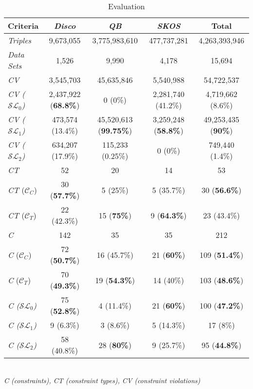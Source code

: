 \documentclass{llncs}
\begin{document}
{{\begin{table}[H]
		\scriptsize
    \begin{center}
    \begin{tabular}{@{}lcccc@{}}
    \\       \textbf{Criteria}
           & \textbf{\emph{Disco}}
           & \textbf{\emph{QB}}
					 & \textbf{\emph{SKOS}}
					 & \textbf{Total}
    \\ \midrule
		\emph{Triples} & 9,673,055 & 3,775,983,610 & 477,737,281 & 4,263,393,946 \\
		\emph{Data Sets} & 1,526 & 9,990 & 4,178 & 15,694 \\
		\hline
    \emph{CV} & 3,545,703 & 45,635,846 & 5,540,988 & 54,722,537\\
		\emph{CV ($\mathcal{SL}_{0}$)} & 2,437,922 (\textbf{68.8\%}) & 0 (0\%) & 2,281,740 (41.2\%) & 4,719,662 (8.6\%) \\
		\emph{CV ($\mathcal{SL}_{1}$)} & 473,574 (13.4\%) & 45,520,613 (\textbf{99.75\%}) & 3,259,248 (\textbf{58.8\%}) & 49,253,435 (\textbf{90\%}) \\
    \emph{CV ($\mathcal{SL}_{2}$)} & 634,207 (17.9\%) & 115,233 (0.25\%) & 0 (0\%) & 749,440 (1.4\%) \\
		\hline
		\emph{CT} & 52 & 20 & 14 & 53 \\
		\emph{CT} ($\mathcal{C}_{C}$) & 30 (\textbf{57.7\%}) & 5 (25\%) & 5 (35.7\%) & 30 (\textbf{56.6\%}) \\
		\emph{CT} ($\mathcal{C}_{T}$) & 22 (42.3\%) & 15 (\textbf{75\%}) & 9 (\textbf{64.3\%}) & 23 (43.4\%) \\
		\hline
		\emph{C} & 142 & 35 & 35 & 212 \\
		\hline
		\emph{C} ($\mathcal{C}_{C}$) & 72 (\textbf{50.7\%}) & 16 (45.7\%) & 21 (\textbf{60\%}) & 109 (\textbf{51.4\%}) \\
		\emph{C} ($\mathcal{C}_{T}$) & 70 (\textbf{49.3\%}) & 19 (\textbf{54.3\%}) & 14 (40\%) & 103 (\textbf{48.6\%}) \\
		\hline
		\emph{C ($\mathcal{SL}_{0}$)} & 75 (\textbf{52.8\%})& 4 (11.4\%) & 21 (\textbf{60\%}) & 100 (\textbf{47.2\%}) \\
		\emph{C ($\mathcal{SL}_{1}$)} & 9 (6.3\%)& 3 (8.6\%) & 5 (14.3\%) & 17 (8\%) \\
		\emph{C ($\mathcal{SL}_{2}$)} & 58 (40.8\%) & 28 (\textbf{80\%}) & 9 (25.7\%) & 95 (\textbf{44.8\%}) \\
    \bottomrule
    \end{tabular}
    \\ \emph{C (constraints), CT (constraint types), CV (constraint violations)}
    \caption{Evaluation}
		\label{tab:evaluation}
    \end{center}
\end{table}

}}
\end{document}
